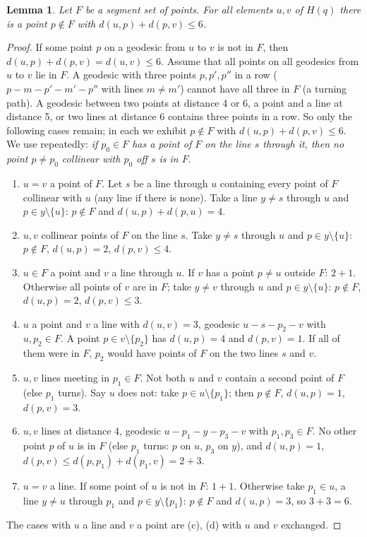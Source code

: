 \documentclass[11pt]{amsart}
\newtheorem{lemma}[theorem]{Lemma}
\theoremstyle{definition}
\theoremstyle{remark}
\numberwithin{equation}{section}
\begin{document}
\begin{lemma}\label{lem:segment}
Let $F$ be a segment set of points. For all elements $u,v$ of $H(q)$ there is a point $p\notin F$ with
$d(u,p)+d(p,v)\le6$.
\end{lemma}

\begin{proof}
If some point $p$ on a geodesic from $u$ to $v$ is not in $F$, then $d(u,p)+d(p,v)=d(u,v)\le6$. Assume that all points on
all geodesics from $u$ to $v$ lie in $F$. A geodesic with three points $p,p',p''$ in a row ($p-m-p'-m'-p''$ with lines
$m\ne m'$) cannot have all three in $F$ (a turning path). A geodesic between two points at distance 4 or 6, a point and a
line at distance 5, or two lines at distance 6 contains three points in a row. So only the following cases remain; in each
we exhibit $p\notin F$ with $d(u,p)+d(p,v)\le6$. We use repeatedly: \emph{if $p_0\in F$ has a point of $F$ on the line $s$
through it, then no point $p\ne p_0$ collinear with $p_0$ off $s$ is in $F$}.
\begin{enumerate}[label=(\alph*)]
\item $u=v$ a point of $F$. Let $s$ be a line through $u$ containing every point of $F$ collinear with $u$ (any line if there
  is none). Take a line $y\ne s$ through $u$ and $p\in y\setminus\{u\}$: $p\notin F$ and $d(u,p)+d(p,u)=4$.
\item $u,v$ collinear points of $F$ on the line $s$. Take $y\ne s$ through $u$ and $p\in y\setminus\{u\}$: $p\notin F$,
  $d(u,p)=2$, $d(p,v)\le4$.
\item $u\in F$ a point and $v$ a line through $u$. If $v$ has a point $p\ne u$ outside $F$: $2+1$. Otherwise all points of
  $v$ are in $F$; take $y\ne v$ through $u$ and $p\in y\setminus\{u\}$: $p\notin F$, $d(u,p)=2$, $d(p,v)\le3$.
\item $u$ a point and $v$ a line with $d(u,v)=3$, geodesic $u-s-p_2-v$ with $u,p_2\in F$. A point $p\in v\setminus\{p_2\}$
  has $d(u,p)=4$ and $d(p,v)=1$. If all of them were in $F$, $p_2$ would have points of $F$ on the two lines $s$ and $v$.
\item $u,v$ lines meeting in $p_1\in F$. Not both $u$ and $v$ contain a second point of $F$ (else $p_1$ turns). Say $u$ does
  not: take $p\in u\setminus\{p_1\}$; then $p\notin F$, $d(u,p)=1$, $d(p,v)=3$.
\item $u,v$ lines at distance 4, geodesic $u-p_1-y-p_3-v$ with $p_1,p_3\in F$. No other point $p$ of $u$ is in $F$ (else
  $p_1$ turns: $p$ on $u$, $p_3$ on $y$), and $d(u,p)=1$, $d(p,v)\le d(p,p_1)+d(p_1,v)=2+3$.
\item $u=v$ a line. If some point of $u$ is not in $F$: $1+1$. Otherwise take $p_1\in u$, a line $y\ne u$ through $p_1$ and
  $p\in y\setminus\{p_1\}$: $p\notin F$ and $d(u,p)=3$, so $3+3=6$.
\end{enumerate}
The cases with $u$ a line and $v$ a point are (c), (d) with $u$ and $v$ exchanged.
\end{proof}
\end{document}
